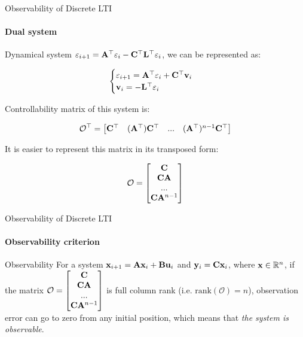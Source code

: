 \documentclass{beamer}
\begin{document}
\begin{frame}{Observability of Discrete LTI}
\framesubtitle{Dual system}
\begin{flushleft}

Dynamical system $\varepsilon_{i+1} = \mathbf{A}^\top \varepsilon_i - \mathbf{C}^\top \mathbf{L}^\top \varepsilon_i$, we can be represented as:

\begin{equation}
\begin{cases}
\varepsilon_{i+1} = \mathbf{A}^\top \varepsilon_i + \mathbf{C}^\top \mathbf{v}_i \\
\mathbf{v}_i = - \mathbf{L}^\top \varepsilon_i
\end{cases}
\end{equation}

Controllability matrix of this system is:

\begin{equation}
\mathcal{O}^\top = \begin{bmatrix}
    \mathbf{C}^\top &
    (\mathbf{A}^\top) \mathbf{C}^\top & ... &
    (\mathbf{A}^\top)^{n - 1} \mathbf{C}^\top
    \end{bmatrix}
\end{equation}

It is easier to represent this matrix in its transposed form:

\begin{equation}
\mathcal{O} = \begin{bmatrix}
    \mathbf{C} \\
    \mathbf{C}\mathbf{A}  \\ ... \\
    \mathbf{C}\mathbf{A}^{n - 1}
    \end{bmatrix}
\end{equation}

\end{flushleft}
\end{frame}


\begin{frame}{Observability of Discrete LTI}
\framesubtitle{Observability criterion}
\begin{flushleft}

\begin{block}{Observability}
For a system $\mathbf{x}_{i+1} = \mathbf{A}  \mathbf{x}_i + \mathbf{B} \mathbf{u}_i$ and $\mathbf{y}_i = \mathbf{C}  \mathbf{x}_i$, where $\mathbf{x} \in \mathbb{R}^n$, if the matrix $\mathcal{O} = \begin{bmatrix}
    \mathbf{C} \\
    \mathbf{C}\mathbf{A}  \\ ... \\
    \mathbf{C}\mathbf{A}^{n - 1}
    \end{bmatrix}$ is full column rank (i.e. $\text{rank}(\mathcal{O}) = n$), observation error can go to zero from any initial position, which means that \emph{the system is observable}.
\end{block}

\end{flushleft}
\end{frame}
\end{document}
